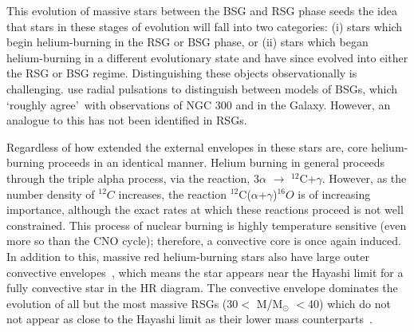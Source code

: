 This evolution of massive stars between the BSG and RSG phase seeds the idea that stars in these stages of evolution will fall into two categories:
(i) stars which begin helium-burning in the RSG or BSG phase, or (ii) stars which began helium-burning in a different evolutionary state and have since evolved into either the RSG or BSG regime.
Distinguishing these objects observationally is challenging.
\cite{Saio13} use radial pulsations to distinguish between models of BSGs, which \textquoteleft roughly agree\textquoteright ~with observations of NGC 300 and in the Galaxy.
However, an analogue to this has not been identified in RSGs.


Regardless of how extended the external envelopes in these stars are, core helium-burning proceeds in an identical manner.
Helium burning in general proceeds through the triple alpha process, via the reaction, 3$\alpha$ $\rightarrow$ $^{12}$C+$\gamma$.
However, as the number density of $^{12}C$ increases, the reaction $^{12}$C($\alpha$+$\gamma$)$^{16}O$ is of increasing importance, although the exact rates at which these reactions proceed is not well constrained.
This process of nuclear burning is highly temperature sensitive (even more so than the CNO cycle); therefore, a convective core is once again induced.
In addition to this, massive red helium-burning stars also have large outer convective envelopes~\citep{b:KippenhahnWeigert}, which means the star appears near the Hayashi limit for a fully convective star in the HR diagram.
The convective envelope dominates the evolution of all but the most massive RSGs (30$<$ M/M$_{\odot}$ $<$40) which do not not appear as close to the Hayashi limit as their lower mass counterparts~\citep[see Figure 1 in][]{Saio13}.





